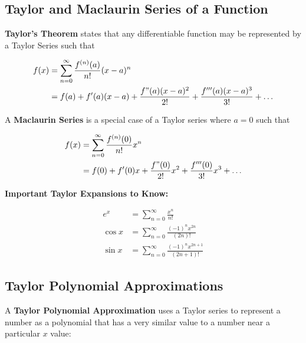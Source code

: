     \subsection{Taylor and Maclaurin Series of a Function}
        \color{purple} \textbf{Taylor's Theorem} \color{black} states that any differentiable
        function may be represented by a Taylor Series such that

        \begin{align*}
            f(x) &= \sum^\infty_{n=0}\frac{f^{(n)}(a)}{n!}(x-a)^n \\
                 &= f(a)+f'(a)(x-a)+\frac{f"(a)(x-a)^2}{2!}+\frac{f'''(a)(x-a)^3}{3!}+\dots
        \end{align*}

        \noindent A \color{purple} \textbf{Maclaurin Series} \color{black} is a special case of a
        Taylor series where $a=0$ such that

        \begin{align*}
            f(x) &= \sum^\infty_{n=0} \frac{f^{(n)}(0)}{n!}x^n \\
                 &= f(0) + f'(0)x + \frac{f"(0)}{2!}x^2 + \frac{f'''(0)}{3!}x^3+\dots
        \end{align*}

        \noindent \color{purple} \textbf{Important Taylor Expansions to Know:} \color{black}

        \begin{align*}
            e^x     &= \sum^\infty_{n=0} \frac{x^n}{n!} \\
            \cos{x} &= \sum^\infty_{n=0} \frac{(-1)^n x^{2n}}{(2n)!} \\
            \sin{x} &= \sum^\infty_{n=0} \frac{(-1)^n x^{2n+1}}{(2n+1)!}
        \end{align*}


    \subsection{Taylor Polynomial Approximations}
        A \color{purple} \textbf{Taylor Polynomial Approximation} \color{black} uses a Taylor series
        to represent a number as a polynomial that has a very similar value to a number near
        a particular $x$ value:

